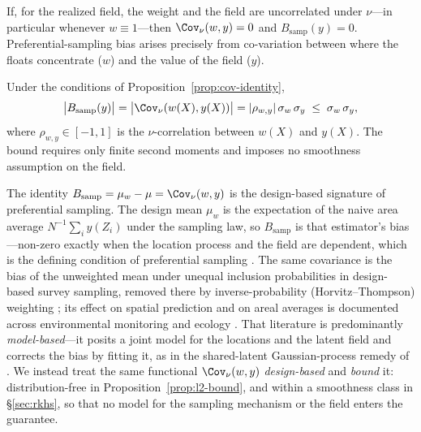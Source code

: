 \begin{remark}
\label{rem:zero-bias}
If, for the realized field, the weight and the field are uncorrelated
under $\nu$---in particular whenever $w\equiv1$---then
$\Cov_\nu(w,y)=0$ and $B_{\mathrm{samp}}(y)=0$. Preferential-sampling
bias arises precisely from co-variation between where the floats
concentrate ($w$) and the value of the field ($y$).
\end{remark}

\begin{proposition}
\label{prop:l2-bound}
Under the conditions of Proposition~\ref{prop:cov-identity},
\[
  \big|B_{\mathrm{samp}}(y)\big|
  = \big|\Cov_\nu(w(X),y(X))\big|
  = |\rho_{w,y}|\,\sigma_w\,\sigma_y
  \;\le\; \sigma_w\,\sigma_y,
\]
where $\rho_{w,y}\in[-1,1]$ is the $\nu$-correlation between $w(X)$ and
$y(X)$. The bound requires only finite second moments and imposes no
smoothness assumption on the field.
\end{proposition}

\begin{remark}
\label{rem:related-samp}
The identity $B_{\mathrm{samp}}=\mu_w-\mu=\Cov_\nu(w,y)$ is the design-based
signature of preferential sampling. The design mean $\mu_w$ is the expectation
of the naive area average $N^{-1}\sum_i y(Z_i)$ under the sampling law, so
$B_{\mathrm{samp}}$ is that estimator's bias---non-zero exactly when the
location process and the field are dependent, which is the defining condition of
preferential sampling \citep{diggle2010}. The same covariance is the bias of the
unweighted mean under unequal inclusion probabilities in design-based survey
sampling, removed there by inverse-probability (Horvitz--Thompson) weighting
\citep{horvitz1952,sarndal1992}; its effect on spatial prediction and on areal
averages is documented across environmental monitoring and ecology
\citep{gelfand2012,zidek2014,conn2017,dumelle2022}. That literature is
predominantly \emph{model-based}---it posits a joint model for the locations and
the latent field and corrects the bias by fitting it, as in the shared-latent
Gaussian-process remedy of \citet{diggle2010}. We instead treat the same
functional $\Cov_\nu(w,y)$ \emph{design-based} and \emph{bound} it:
distribution-free in Proposition~\ref{prop:l2-bound}, and within a smoothness
class in \S\ref{sec:rkhs}, so that no model for the sampling mechanism or the
field enters the guarantee.
\end{remark}

